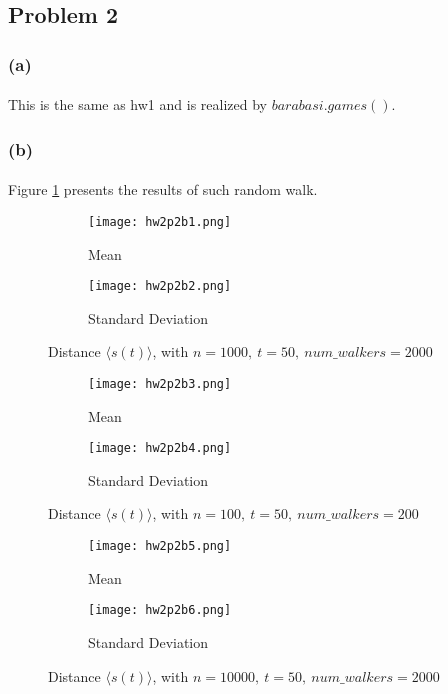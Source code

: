 \subsection*{Problem 2}
\subsubsection*{(a)}
\paragraph{}
This is the same as hw1 and is realized by $barabasi.games()$.
\subsubsection*{(b)}
\paragraph{}
Figure \ref{fig:b1} presents the results of such random walk.
\begin{figure}[h]
	\centering
	\begin{subfigure}{.5\textwidth}
		\centering
		\texttt{[image: hw2p2b1.png]}
		\caption{Mean}
	\end{subfigure}%
	\begin{subfigure}{.5\textwidth}
		\centering
		\texttt{[image: hw2p2b2.png]}
		\caption{Standard Deviation}
	\end{subfigure}
	\caption{Distance $\langle s(t)\rangle$, with $n = 1000,\ t = 50,\ num\_walkers = 2000$}
	\label{fig:b1}
\end{figure}

\begin{figure}[h!]
	\centering
	\begin{subfigure}{.5\textwidth}
		\centering
		\texttt{[image: hw2p2b3.png]}
		\caption{Mean}
	\end{subfigure}%
	\begin{subfigure}{.5\textwidth}
		\centering
		\texttt{[image: hw2p2b4.png]}
		\caption{Standard Deviation}
	\end{subfigure}
	\caption{Distance $\langle s(t)\rangle$, with $n = 100,\ t = 50,\ num\_walkers = 200$}
	\label{fig:b2}
\end{figure}

\begin{figure}[h!]
	\centering
	\begin{subfigure}{.5\textwidth}
		\centering
		\texttt{[image: hw2p2b5.png]}
		\caption{Mean}
	\end{subfigure}%
	\begin{subfigure}{.5\textwidth}
		\centering
		\texttt{[image: hw2p2b6.png]}
		\caption{Standard Deviation}
	\end{subfigure}
	\caption{Distance $\langle s(t)\rangle$, with $n = 10000,\ t = 50,\ num\_walkers = 2000$}
	\label{fig:b3}
\end{figure}

